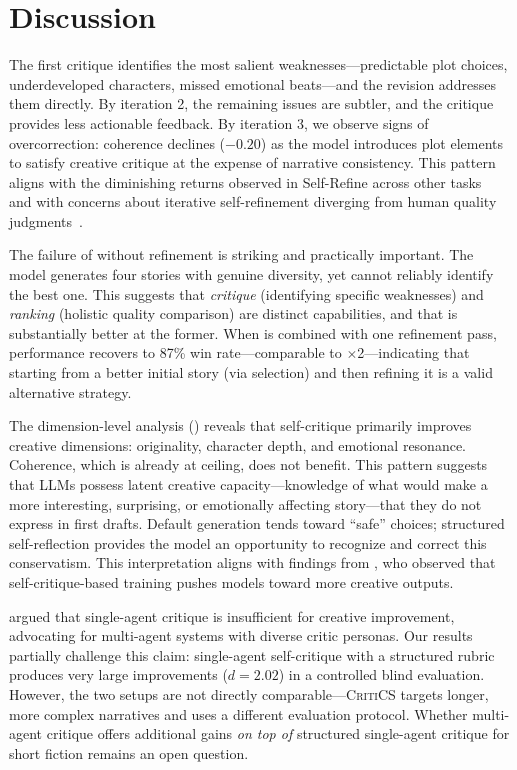\section{Discussion}
\label{sec:discussion}

The first critique identifies the most salient weaknesses---predictable plot choices, underdeveloped characters, missed emotional beats---and the revision addresses them directly.
By iteration 2, the remaining issues are subtler, and the critique provides less actionable feedback.
By iteration 3, we observe signs of overcorrection: coherence declines ($-0.20$) as the model introduces plot elements to satisfy creative critique at the expense of narrative consistency.
This pattern aligns with the diminishing returns observed in Self-Refine across other tasks~\citep{madaan2023selfrefine} and with concerns about iterative self-refinement diverging from human quality judgments~\citep{pan2024rewardhacking}.

The failure of \bestofn without refinement is striking and practically important.
The model generates four stories with genuine diversity, yet cannot reliably identify the best one.
This suggests that \emph{critique} (identifying specific weaknesses) and \emph{ranking} (holistic quality comparison) are distinct capabilities, and that \gptfour is substantially better at the former.
When \bestofn is combined with one refinement pass, performance recovers to 87\% win rate---comparable to \selfrefine $\times$2---indicating that starting from a better initial story (via selection) and then refining it is a valid alternative strategy.

The dimension-level analysis () reveals that self-critique primarily improves creative dimensions: originality, character depth, and emotional resonance.
Coherence, which is already at ceiling, does not benefit.
This pattern suggests that LLMs possess latent creative capacity---knowledge of what would make a more interesting, surprising, or emotionally affecting story---that they do not express in first drafts.
Default generation tends toward ``safe'' choices; structured self-reflection provides the model an opportunity to recognize and correct this conservatism.
This interpretation aligns with findings from \citet{jia2025writingzero}, who observed that self-critique-based training pushes models toward more creative outputs.

\citet{bae2024critics} argued that single-agent critique is insufficient for creative improvement, advocating for multi-agent systems with diverse critic personas.
Our results partially challenge this claim: single-agent self-critique with a structured rubric produces very large improvements ($d = 2.02$) in a controlled blind evaluation.
However, the two setups are not directly comparable---\textsc{CritiCS} targets longer, more complex narratives and uses a different evaluation protocol.
Whether multi-agent critique offers additional gains \emph{on top of} structured single-agent critique for short fiction remains an open question.

